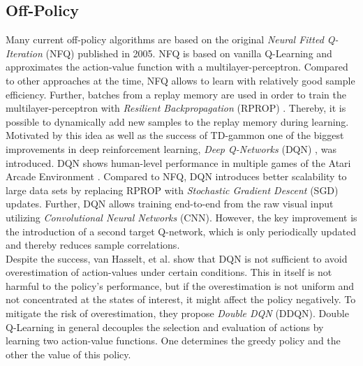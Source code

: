  	\subsection{Off-Policy \label{sec:off-policy}}
	Many current off-policy algorithms are based on the original \textit{Neural Fitted Q-Iteration} (NFQ) \cite{Riedmiller2005} published in 2005. 
	NFQ is based on vanilla Q-Learning \cite{Watkins1989} and approximates the action-value function with a multilayer-perceptron.
	Compared to other approaches at the time, NFQ allows to learn with relatively good sample efficiency.
	Further, batches from a replay memory \cite{Lin1992} are used in order to train the multilayer-perceptron with \textit{Resilient Backpropagation} (RPROP) \cite{Riedmiller1993}.
	Thereby, it is possible to dynamically add new samples to the replay memory during learning.
	Motivated by this idea as well as the success of TD-gammon \cite{Tesauro1994} one of the biggest improvements in deep reinforcement learning, \textit{Deep Q-Networks} (DQN) \cite{Mnih2015}, was introduced.   
	DQN shows human-level performance in multiple games of the Atari Arcade Environment \cite{Bellemare2013}. 
	Compared to NFQ, DQN introduces better scalability to large data sets by replacing RPROP with \textit{Stochastic Gradient Descent} (SGD) updates. 
	Further, DQN allows training end-to-end from the raw visual input utilizing \textit{Convolutional Neural Networks} (CNN). 
	However, the key improvement is the introduction of a second target Q-network, which is only periodically updated and thereby reduces sample correlations.\\
	Despite the success, van Hasselt, et al. \cite{VanHasselt2016} show that DQN is not sufficient to avoid overestimation of action-values under certain conditions. 
	This in itself is not harmful to the policy's performance, but if the overestimation is not uniform and not concentrated at the states of interest, it might affect the policy negatively. 
	To mitigate the risk of overestimation, they propose \textit{Double DQN} (DDQN).
	Double Q-Learning \cite{VanHasselt2010} in general decouples the selection and evaluation of actions by learning two action-value functions. 
	One determines the greedy policy and the other the value of this policy.  
